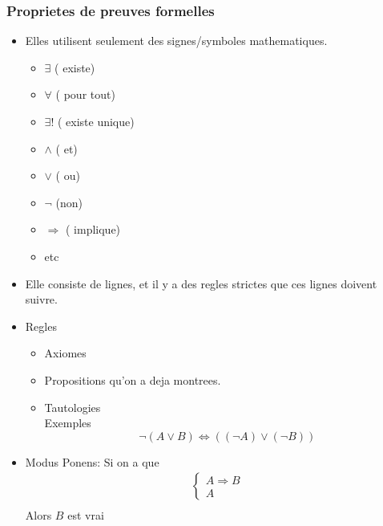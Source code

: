 \documentclass[../main.tex]{subfiles}
\begin{document}
\subsubsection{Proprietes de preuves formelles}
\begin{itemize}
	\item Elles utilisent seulement des signes/symboles mathematiques.
		\begin{itemize}
			\item $\exists$ ( existe)\\
			\item $\forall$ ( pour tout)\\
			\item $\exists !$ ( existe unique)\\
			\item  $\land$  ( et) \\
			\item $\lor$ ( ou) \\
			\item $\neg$ (non) \\
			\item  $\Rightarrow$ ( implique)\\
			\item etc
		\end{itemize}
	\item Elle consiste de lignes, et il y a des regles strictes que ces lignes doivent suivre.\\
	\item Regles
		\begin{itemize}
			\item Axiomes\\
			\item Propositions qu'on a deja montrees.\\
			\item Tautologies\\
				Exemples
				\[ 
					\neg ( A \lor B) \iff ( ( \neg A) \lor ( \neg B))
				\]
		\end{itemize}
	\item Modus Ponens: Si on a que 
		\begin{align*}
		\begin{cases}
		A \Rightarrow B\\
		A
		\end{cases}\\
		\end{align*}
		Alors $B$ est vrai
\end{itemize}
\end{document}
